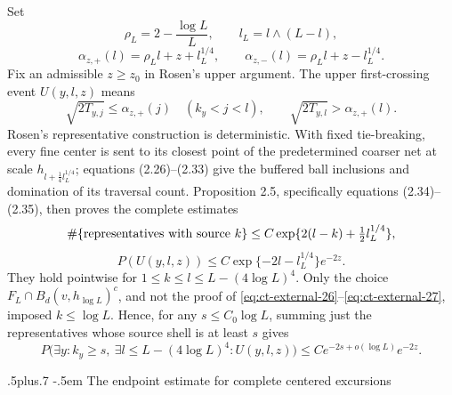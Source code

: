 \documentclass[12pt,reqno]{amsart}
\makeatletter
\def\subsubsection{\@startsection{subsubsection}{3}{0pt}%
  {.5\linespacing plus.7\linespacing}
  {-.5em}
  {\normalfont\itshape}}
\theoremstyle{plain}
\theoremstyle{definition}
\theoremstyle{remark}
\numberwithin{equation}{section}
\makeatother
\begin{document}
Set
\[
\rho_L=2-\frac{\log L}{L},\qquad l_L=l\wedge(L-l),
\]
\begin{equation}
\alpha_{z,+}(l)=\rho_Ll+z+l_L^{1/4},\qquad
 \alpha_{z,-}(l)=\rho_Ll+z-l_L^{1/4}.\label{eq:ct-external-25}
\end{equation}
Fix an admissible $z\ge z_0$ in Rosen's upper argument.  The upper
first-crossing event $U(y,l,z)$ means
\[
\sqrt{2T_{y,j}}\le\alpha_{z,+}(j)
       \quad(k_y<j<l),\qquad
 \sqrt{2T_{y,l}}>\alpha_{z,+}(l).
\]
Rosen's representative construction is deterministic.  With fixed
tie-breaking, every fine center is sent to its closest point of the
predetermined coarser net at scale
$h_{l+\frac14 l_L^{1/4}}$; equations (2.26)--(2.33) give the buffered
ball inclusions and domination of its traversal count.  Proposition 2.5,
specifically equations (2.34)--(2.35), then proves the complete estimates
\begin{equation}
\#\{\hbox{representatives with source }k\}
 \le C\exp\{2(l-k)+\tfrac12l_L^{1/4}\},\label{eq:ct-external-26}
\end{equation}
\begin{equation}
P(U(y,l,z))\le
 C\exp\{-2l-l_L^{1/4}\}e^{-2z}.\label{eq:ct-external-27}
\end{equation}
They hold pointwise for $1\le k\le l\le L-(4\log L)^4$.
Only the choice $F_L\cap B_d(v,h_{\log L})^c$, and not the proof of
\eqref{eq:ct-external-26}--\eqref{eq:ct-external-27}, imposed $k\le\log L$.  Hence, for any
$s\le C_0\log L$, summing just the representatives whose source shell
is at least $s$ gives
\begin{equation}
P\big(\exists y:k_y\ge s,\ \exists l\le L-(4\log L)^4:
              U(y,l,z)\big)
       \le C e^{-2s+o(\log L)}e^{-2z}.\label{eq:ct-external-28}
\end{equation}

\subsubsection{The endpoint estimate for complete centered excursions}
\end{document}
